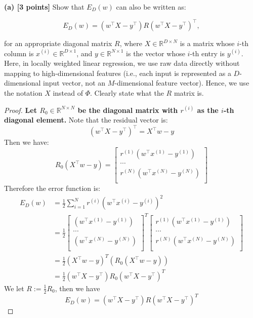 \documentclass[lang=cn,11pt]{elegantbook}
\begin{document}
\textbf{(a) [3 points]} Show that \( E_D(w) \) can also be written as:

\[
E_D(w) = (w^\top X - y^\top)R(w^\top X - y^\top)^\top,
\]

for an appropriate diagonal matrix \( R \), where \( X \in \mathbb{R}^{D \times N} \) is a matrix whose \( i \)-th column is \( x^{(i)} \in \mathbb{R}^{D \times 1} \), and \( y \in \mathbb{R}^{N \times 1} \) is the vector whose \( i \)-th entry is \( y^{(i)} \). Here, in locally weighted linear regression, we use raw data directly without mapping to high-dimensional features (i.e., each input is represented as a \( D \)-dimensional input vector, not an \( M \)-dimensional feature vector). Hence, we use the notation \( X \) instead of \( \Phi \). Clearly state what the \( R \) matrix is.
\begin{proof}
    
\textbf{Let \( R_0 \in \mathbb{R}^{N \times N} \) be the diagonal matrix with \( r^{(i)} \) as the \( i \)-th diagonal element.}
Note that the residual vector is:
\[
(w^\top X - y^\top)^\top = X^\top w - y
\]
Then we have:
$$
R_0(X^\top w - y) =  \begin{bmatrix} r^{(1)}(w^\top x^{(1)} - y^{(1)}) \\ \cdots \\r^{(N)}(w^\top x^{(N)} - y^{(N)})
\\ \end{bmatrix}
$$
Therefore the error function is:
\begin{align*}
  E_D(w) &= \frac{1}{2} \sum_{i=1}^N r^{(i)}(w^\top x^{(i)} - y^{(i)})^2 \\
  &= 
\frac{1}{2}\begin{bmatrix} (w^\top x^{(1)} - y^{(1)}) \\ \cdots \\(w^\top x^{(N)} - y^{(N)})
\\ \end{bmatrix}^T \begin{bmatrix} r^{(1)}(w^\top x^{(1)} - y^{(1)}) \\ \cdots \\r^{(N)}(w^\top x^{(N)} - y^{(N)})
\\ \end{bmatrix} \\
&=  \frac{1}{2}(X^\top w - y)^T (R_0(X^\top w - y))\\
&= \frac{1}{2}(w^\top X - y^\top) R_0 (w^\top X - y^\top)^T
\end{align*}
We let $R := \frac{1}{2} R_0$, then we have 
$$
E_D(w) = (w^\top X - y^\top) R (w^\top X - y^\top)^T
$$

\end{proof}
\end{document}
